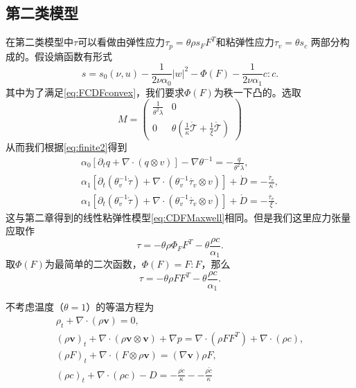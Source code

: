 \documentclass{article}
\begin{document}
\subsection{第二类模型}
在第二类模型中$\tau$可以看做由弹性应力$\tau_p = \theta \rho s_F F^T$和粘弹性应力$\tau_v=\theta s_c$
两部分构成的。假设熵函数有形式
\begin{equation*}
 	s = s_0(\nu,u) - \frac{1}{2 \nu \alpha_0} |w|^2 - \Phi (F)  - \frac{1}{2\nu \alpha_1}c:c .
\end{equation*}
其中为了满足\eqref{eq:FCDFconvex}，我们要求$\Phi(F)$为秩一下凸的。选取
\begin{equation*}
	M = \left( \begin{array}{ccc} 
			\frac{1}{\theta^2 \lambda} & 0 \\
			0 &  \theta(\frac{1}{\kappa} \dot{\mathcal{T}} + \frac{1}{\xi} \mathring{\mathcal{T}})  
		\end{array} \right)
\end{equation*}
从而我们根据\eqref{eq:finite2}得到
	\begin{subequations}
		\begin{align*}
			\alpha_0 [\partial_t q +  \nabla \cdot (q \otimes v)] - \nabla \theta^{-1} = -\frac{q}{\theta^2 \lambda}, \\
			\alpha_1[\partial_t (\theta_v^{-1} \dot{\tau}) + \nabla \cdot (\theta_v^{-1} \dot{\tau_v} \otimes v)] + \dot{D} = -\frac{\dot{\tau_v}}{\kappa}, \\
			\alpha_1[\partial_t (\theta_v^{-1} \mathring{\tau}) + \nabla \cdot (\theta_v^{-1} \mathring{\tau_v} \otimes v)] + \mathring{D} = -\frac{\dot{\tau_v}}{\xi}. 
		\end{align*}
	\end{subequations}
这与第二章得到的线性粘弹性模型\eqref{eq:CDFMaxwell}相同。但是我们这里应力张量应取作
\begin{equation*}
	\tau = -\theta \rho \Phi_F F^T - \theta \frac{\rho c}{\alpha_1}.
\end{equation*}
取$\Phi(F)$为最简单的二次函数，$\Phi(F) = F:F$，那么
\begin{equation*}
	\tau = -\theta \rho F F^T - \theta \frac{\rho c}{\alpha_1}.
\end{equation*}

不考虑温度（$\theta=1$）的等温方程为
\begin{subequations}\label{eq:compressibleRelax}
  \begin{align}
  \rho_t + \nabla \cdot (\rho \mathbf{v}) = 0, \\
  (\rho \mathbf{v})_t + \nabla \cdot ( \rho \mathbf{v} \otimes \mathbf{v}) + \nabla p = \nabla \cdot (\rho F F^T) + \nabla \cdot ( \rho c), \\
  (\rho F)_t + \nabla \cdot (F \otimes \rho \mathbf{v}) = (\nabla \mathbf{v}) \rho F, \\
  (\rho c)_t + \nabla \cdot (\rho c) - D  = -\frac{\rho \dot{c}}{\kappa} - -\frac{\rho \mathring{c}}{\kappa}
\end{align}
\end{subequations}
\end{document}
